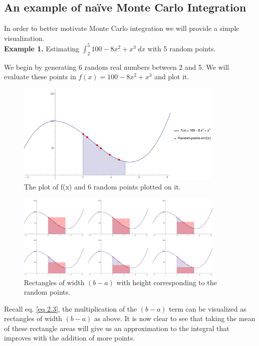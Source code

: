 \documentclass[12pt]{article}
\numberwithin{equation}{section}
\begin{document}
\subsection{An example of naïve Monte Carlo Integration}
In order to better motivate Monte Carlo integration we will provide a simple visualization.\\
\textbf{Example 1.} Estimating $\int_2^5 100 - 8x^2 + x^3\ dx$ with 5 random points.
\par We begin by generating 6 random real numbers between 2 and 5. We will evaluate these points in $f(x)=100-8x^2+x^3$ and plot it.
\begin{figure}[!htb]
    \centering
    \includegraphics[width=10cm]{Images/pointsexample.png}
    \caption{The plot of f(x) and 6 random points plotted on it.}
    \label{fig:pointsexample}
\end{figure}
\begin{figure}[!htb]
    \centering
    \includegraphics[width=10cm]{Images/rectexample.png}
    \caption{Rectangles of width $(b-a)$ with height corresponding to the random points.}
    \label{fig:rectexample}
\end{figure}\par
Recall eq. \ref{eq 2.3}, the multiplication of the $(b-a)$ term can be visualized as rectangles of width $(b-a)$ as above.
It is now clear to see that taking the mean of these rectangle areas will give us an approximation to the integral that improves with the addition of more points.
\clearpage
\end{document}

